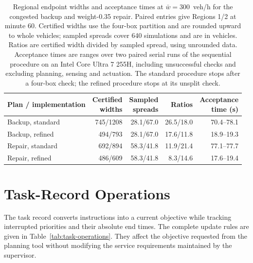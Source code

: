 \documentclass[final]{cas-sc}
\theoremstyle{definition}
\theoremstyle{plain}
\theoremstyle{definition}
\theoremstyle{plain}
\begin{document}
\begin{table}[pos=!htb]
\centering\small
\caption{Regional endpoint widths and acceptance times at
$\bar w=300$~veh/h for the congested backup and weight-0.35 repair.
Paired entries give Regions 1/2 at minute 60. Certified widths use the
four-box partition and are rounded upward to whole vehicles; sampled
spreads cover 640 simulations and are in vehicles. Ratios are certified
width divided by sampled spread, using unrounded data. Acceptance times
are ranges over two paired serial runs of the sequential procedure on
an Intel Core Ultra 7 255H, including unsuccessful checks and excluding
planning, sensing and actuation. The standard procedure stops after a
four-box check; the refined procedure stops at its unsplit check.}
\label{tab:widths-times}
\setlength{\tabcolsep}{4pt}
\begin{tabularx}{\linewidth}{@{}Xrrrr@{}}
\toprule
Plan / implementation & \shortstack{Certified\\widths} &
\shortstack{Sampled\\spreads} & Ratios & \shortstack{Acceptance\\time (s)}\\
\midrule
Backup, standard & 745/1208 & 28.1/67.0 & 26.5/18.0 & 70.4--78.1\\
Backup, refined & 494/793 & 28.1/67.0 & 17.6/11.8 & 18.9--19.3\\
Repair, standard & 692/894 & 58.3/41.8 & 11.9/21.4 & 77.1--77.7\\
Repair, refined & 486/609 & 58.3/41.8 & 8.3/14.6 & 17.6--19.4\\
\bottomrule
\end{tabularx}
\end{table}

\section{Task-Record Operations}
\label{app:task-operations}

The task record converts instructions into a current objective while
tracking interrupted priorities and their absolute end times. The complete
update rules are given in Table~\ref{tab:task-operations}. They affect the
objective requested from the planning tool without modifying the service
requirements maintained by the supervisor.
\end{document}
